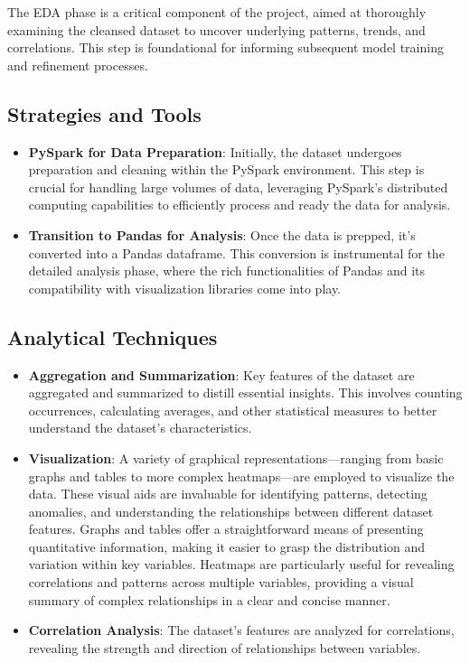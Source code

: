 The EDA phase is a critical component of the project, aimed at thoroughly examining the cleansed dataset to uncover underlying patterns, trends, and correlations.
This step is foundational for informing subsequent model training and refinement processes.

\subsection{Strategies and Tools}\label{subsec:strategies-and-tools}
\begin{itemize}
    \item \textbf{PySpark for Data Preparation}: Initially, the dataset undergoes preparation and cleaning within the PySpark environment.
    This step is crucial for handling large volumes of data, leveraging PySpark's distributed computing capabilities to efficiently process and ready the data for analysis.
    \item \textbf{Transition to Pandas for Analysis}: Once the data is prepped, it's converted into a Pandas dataframe.
    This conversion is instrumental for the detailed analysis phase, where the rich functionalities of Pandas and its compatibility with visualization libraries come into play.
\end{itemize}

\subsection{Analytical Techniques}\label{subsec:analytical-techniques}
\begin{itemize}
    \item \textbf{Aggregation and Summarization}: Key features of the dataset are aggregated and summarized to distill essential insights.
    This involves counting occurrences, calculating averages, and other statistical measures to better understand the dataset's characteristics.
    \item \textbf{Visualization}: A variety of graphical representations—ranging from basic graphs and tables to more complex heatmaps—are employed to visualize the data.
    These visual aids are invaluable for identifying patterns, detecting anomalies, and understanding the relationships between different dataset features. Graphs and tables offer a straightforward means of presenting quantitative information, making it easier to grasp the distribution and variation within key variables.
    Heatmaps are particularly useful for revealing correlations and patterns across multiple variables, providing a visual summary of complex relationships in a clear and concise manner.
    \item \textbf{Correlation Analysis}: The dataset's features are analyzed for correlations, revealing the strength and direction of relationships between variables.
\end{itemize}





